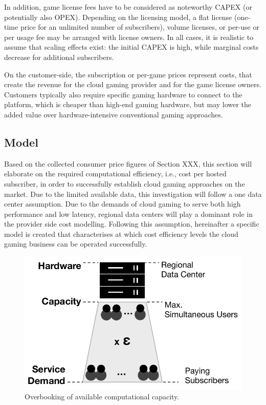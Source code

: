 In addition, game license fees have to be considered as noteworthy CAPEX (or potentially also OPEX). Depending on the licensing model, a flat license (one-time price for an unlimited number of subscribers), volume licenses, or per-use or per usage fee may be arranged with license owners. In all cases, it is realistic to assume that scaling effects exist: the initial CAPEX is high, while marginal costs decrease for additional subscribers. 

On the customer-side, the subscription or per-game prices represent costs, that create the revenue for the cloud gaming provider and for the game license owners. Customers typically also require specific gaming hardware to connect to the platform, which is cheaper than high-end gaming hardware, but may lower the added value over hardware-intensive conventional gaming approaches.

\subsection{Model}

Based on the collected consumer price figures of Section XXX, this section will elaborate on the required computational efficiency, i.e., cost per hosted subscriber, in order to successfully establish cloud gaming approaches on the market. Due to the limited available data, this investigation will follow a one data center assumption. Due to the demands of cloud gaming to serve both high performance and low latency, regional data centers will play a dominant role in the provider side cost modelling. Following this assumption, hereinafter a specific model is created that characterises at which cost efficiency levels the cloud gaming business can be operated successfully.

\begin{figure}[!t]
	\centering
	\includegraphics[width=0.65\columnwidth]{images/overbooking_datacenter.pdf}
	\caption{Overbooking of available computational capacity.}
\label{fig:overbooking_datacenter}
\end{figure}

